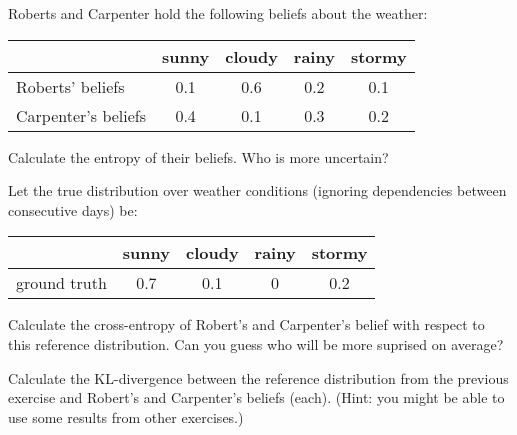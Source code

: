 \documentclass[nobib,nofonts]{tufte-handout}
\begin{document}
\newpage

\bigskip
\noindent \colorbox{mygray}{\centering
  \begin{minipage}{1.0\textwidth}


    \begin{exercise}
      Roberts and Carpenter hold the following beliefs about the weather:

      \begin{center}
        \begin{tabular}{lcccc}
                              & sunny & cloudy & rainy & stormy \\ \midrule
          Roberts' beliefs     & 0.1   & 0.6    & 0.2   & 0.1 \\
          Carpenter's beliefs & 0.4   & 0.1    & 0.3   & 0.2 \\
        \end{tabular}
      \end{center}

        Calculate the entropy of their beliefs. Who is more uncertain?
    \end{exercise}

    \begin{exercise}
      Let the true distribution over weather conditions (ignoring dependencies between consecutive days) be:

      \begin{center}
        \begin{tabular}{lcccc}
                       & sunny & cloudy & rainy & stormy \\ \midrule
          ground truth & 0.7   & 0.1    & 0   & 0.2 \\
        \end{tabular}
      \end{center}

      Calculate the cross-entropy of Robert's and Carpenter's belief with respect to this reference distribution.
      Can you guess who will be more suprised on average?

    \end{exercise}

    \begin{exercise}

      Calculate the KL-divergence between the reference distribution from the previous exercise and Robert's and Carpenter's beliefs (each). (Hint: you might be able to use some results from other exercises.)

    \end{exercise}


\end{minipage}}
\end{document}
